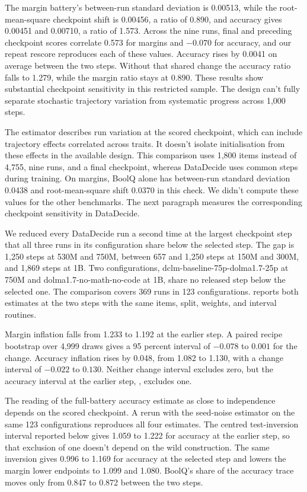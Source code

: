 The margin battery's between-run standard deviation is 0.00513, while the root-mean-square checkpoint shift is 0.00456, a ratio of 0.890, and accuracy gives 0.00451 and 0.00710, a ratio of 1.573. Across the nine runs, final and preceding checkpoint scores correlate 0.573 for margins and $-0.070$ for accuracy, and our repeat rescore reproduces each of these values. Accuracy rises by 0.0041 on average between the two steps. Without that shared change the accuracy ratio falls to 1.279, while the margin ratio stays at 0.890. These results show substantial checkpoint sensitivity in this restricted sample. The design can't fully separate stochastic trajectory variation from systematic progress across 1,000 steps.

The estimator describes run variation at the scored checkpoint, which can include trajectory effects correlated across traits. It doesn't isolate initialisation from these effects in the available design. This comparison uses 1,800 items instead of 4,755, nine runs, and a final checkpoint, whereas DataDecide uses common steps during training. On margins, BoolQ alone has between-run standard deviation 0.0438 and root-mean-square shift 0.0370 in this check. We didn't compute these values for the other benchmarks. The next paragraph measures the corresponding checkpoint sensitivity in DataDecide.

\label{app:checkpoint}
We reduced every DataDecide run a second time at the largest checkpoint step that all three runs in its configuration share below the selected step. The gap is 1,250 steps at 530M and 750M, between 657 and 1,250 steps at 150M and 300M, and 1,869 steps at 1B. Two configurations, dclm-baseline-75p-dolma1.7-25p at 750M and dolma1.7-no-math-no-code at 1B, share no released step below the selected one. The comparison covers 369 runs in 123 configurations.  reports both estimates at the two steps with the same items, split, weights, and interval routines.

Margin inflation falls from 1.233 to 1.192 at the earlier step. A paired recipe bootstrap over 4,999 draws gives a 95 percent interval of $-0.078$ to $0.001$ for the change. Accuracy inflation rises by 0.048, from 1.082 to 1.130, with a change interval of $-0.022$ to $0.130$. Neither change interval excludes zero, but the accuracy interval at the earlier step, , excludes one.

The reading of the full-battery accuracy estimate as close to independence depends on the scored checkpoint. A rerun with the seed-noise estimator on the same 123 configurations reproduces all four estimates. The centred test-inversion interval reported below gives 1.059 to 1.222 for accuracy at the earlier step, so that exclusion of one doesn't depend on the wild construction. The same inversion gives 0.996 to 1.169 for accuracy at the selected step and lowers the margin lower endpoints to 1.099 and 1.080. BoolQ's share of the accuracy trace moves only from 0.847 to 0.872 between the two steps.

